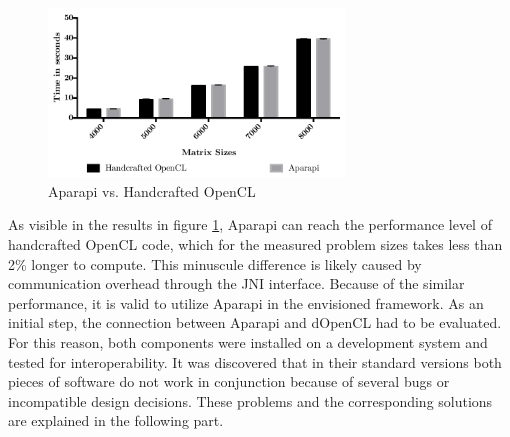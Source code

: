 \begin{figure}[H]
	\includegraphics[width=0.7\textwidth]{images/aparapivsopencl.pdf}
	\centering
	\caption{Aparapi vs. Handcrafted OpenCL}
	\label{img:aparapi_vs_opencl}
\end{figure}

As visible in the results in figure \ref{img:aparapi_vs_opencl}, Aparapi can reach the performance level of handcrafted OpenCL code, which for the measured problem sizes takes less than 2\% longer to compute. This minuscule difference is likely caused by communication overhead through the JNI interface. Because of the similar performance, it is valid to utilize Aparapi in the envisioned framework. As an initial step, the connection between Aparapi and dOpenCL had to be evaluated. For this reason, both components were installed on a development system and tested for interoperability. It was discovered that in their standard versions both pieces of software do not work in conjunction because of several bugs or incompatible design decisions. These problems and the corresponding solutions are explained in the following part.

